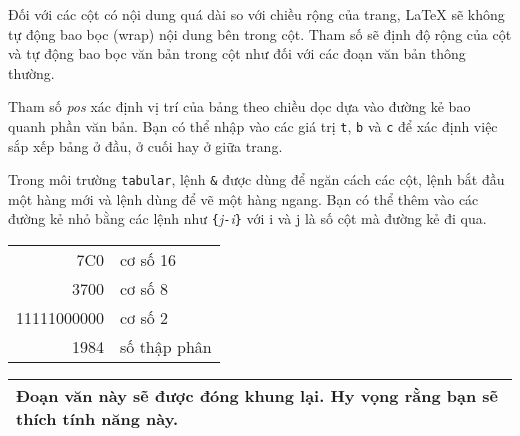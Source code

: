 Đối với các cột có nội dung quá dài so với chiều rộng của trang, \LaTeX{} sẽ không tự động bao bọc (wrap) nội dung bên trong cột. Tham số  sẽ định độ rộng của cột và tự động bao bọc văn bản trong cột như đối với các đoạn văn bản thông thường.

Tham số \emph{pos} xác định vị trí của bảng theo chiều dọc dựa vào đường kẻ bao quanh phần văn bản. Bạn có thể nhập vào các giá trị \texttt{t}, \texttt{b} và \texttt{c} để xác định việc sắp xếp bảng ở đầu, ở cuối hay ở giữa trang.

Trong môi trường \texttt{tabular}, lệnh \texttt{\&} được dùng để ngăn cách các cột, lệnh \ci{\bs} bắt đầu một hàng mới và lệnh  dùng để vẽ một hàng ngang. Bạn có thể thêm vào các đường kẻ nhỏ bằng các lệnh như
\texttt{\{}\emph{j}\texttt{-}\emph{i}\texttt{\}} với i
và j là số cột mà đường kẻ đi qua.

\begin{example}
\begin{tabular}{|r|l|}
\hline 7C0 & cơ số 16 \\
3700 & cơ số 8 \\
\cline{2-2} 11111000000
& cơ số 2
\\ \hline \hline
1984 & số thập phân \\ \hline
\end{tabular}
\end{example}
\begin{example}
\begin{tabular}{|p{4.7cm}|}
\hline
Đoạn văn này sẽ được
đóng khung lại. Hy vọng
rằng bạn sẽ
thích tính năng này.
\\ \hline
\end{tabular}
\end{example}

